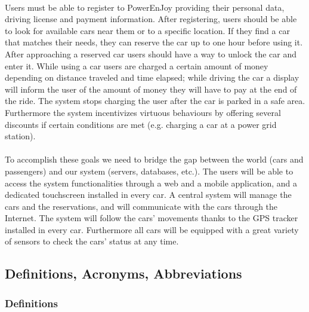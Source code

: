 \documentclass[english]{article}
\begin{document}
\paragraph{}
Users must be able to register to PowerEnJoy providing their personal data, driving license and payment information.
After registering, users should be able to look for available cars near them or to a specific location. If they find a car that matches their needs, they can reserve the car up to one hour before using it. After approaching a reserved car users should have a way to unlock the car and enter it.
While using a car users are charged a certain amount of money depending on distance traveled and time elapsed; while driving the car a display will inform the user of the amount of money they will have to pay at the end of the ride.
The system stops charging the user after the car is parked in a safe area.
Furthermore the system incentivizes virtuous behaviours by offering several discounts if certain conditions are met (e.g. charging a car at a power grid station).

\paragraph{}
To accomplish these goals we need to bridge the gap between the world (cars and passengers) and our system (servers, databases, etc.).
The users will be able to access the system functionalities through a web and a mobile application, and a dedicated touchscreen installed in every car.
A central system will manage the cars and the reservations, and will communicate with the cars through the Internet. The system will follow the cars’ movements thanks to the GPS tracker installed in every car. Furthermore all cars will be equipped with a great variety of sensors to check the cars’ status at any time.


\subsection{Definitions, Acronyms, Abbreviations}

\subsubsection{Definitions}
\end{document}
